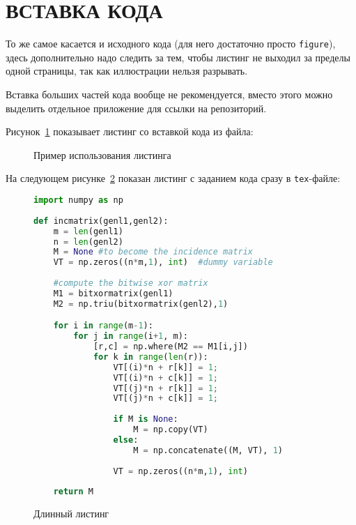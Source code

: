 \section{ВСТАВКА КОДА}

То же самое касается и исходного кода (для него достаточно просто \texttt{figure}), здесь дополнительно надо следить за тем, чтобы листинг не выходил за пределы одной страницы, так как иллюстрации нельзя разрывать.

Вставка больших частей кода вообще не рекомендуется, вместо этого можно выделить отдельное приложение для ссылки на репозиторий.

Рисунок~\ref{src:src1} показывает листинг со вставкой кода из файла:

\begin{figure}

\caption{Пример использования листинга}
\label{src:src1}
\end{figure}

\pagebreak

На следующем рисунке~\ref{src:src2} показан листинг с заданием кода сразу в \texttt{tex}-файле:

\begin{figure}
\begin{lstlisting}[language=Python]
import numpy as np
    
def incmatrix(genl1,genl2):
    m = len(genl1)
    n = len(genl2)
    M = None #to become the incidence matrix
    VT = np.zeros((n*m,1), int)  #dummy variable
    
    #compute the bitwise xor matrix
    M1 = bitxormatrix(genl1)
    M2 = np.triu(bitxormatrix(genl2),1) 

    for i in range(m-1):
        for j in range(i+1, m):
            [r,c] = np.where(M2 == M1[i,j])
            for k in range(len(r)):
                VT[(i)*n + r[k]] = 1;
                VT[(i)*n + c[k]] = 1;
                VT[(j)*n + r[k]] = 1;
                VT[(j)*n + c[k]] = 1;
                
                if M is None:
                    M = np.copy(VT)
                else:
                    M = np.concatenate((M, VT), 1)
                
                VT = np.zeros((n*m,1), int)
    
    return M
\end{lstlisting}
\caption{Длинный листинг}
\label{src:src2}
\end{figure}
